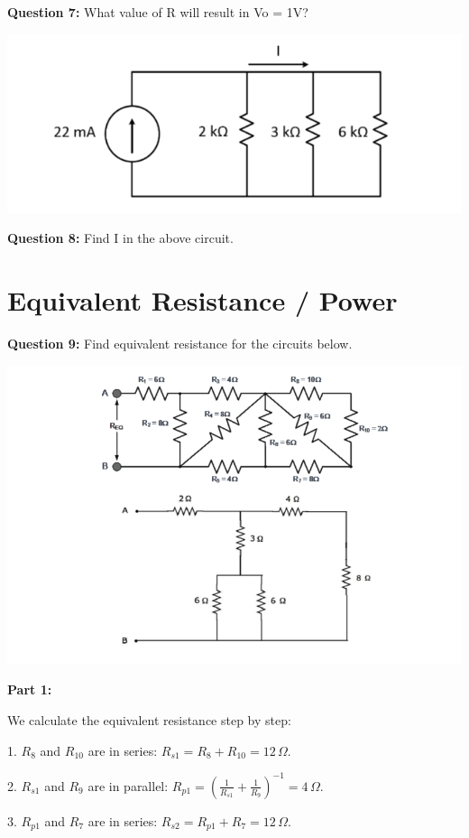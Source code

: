 \documentclass{article}
\begin{document}
\textbf{Question 7:} What value of R will result in Vo = 1V?

\begin{center}
\includegraphics[width=0.75\linewidth]{figures/6.png}
\end{center}

\textbf{Question 8:} Find I in the above circuit.

\section*{Equivalent Resistance / Power}
\textbf{Question 9:} Find equivalent resistance for the circuits below.

\begin{center}

        \includegraphics[width=0.75\linewidth]{figures/image.png}
\end{center}

\textbf{Part 1:}

We calculate the equivalent resistance step by step:

1. \( R_8 \) and \( R_{10} \) are in series:  
   \( R_{s1} = R_8 + R_{10} = 12 \, \Omega \).

2. \( R_{s1} \) and \( R_9 \) are in parallel:  
   \( R_{p1} = \left( \frac{1}{R_{s1}} + \frac{1}{R_9} \right)^{-1} = 4 \, \Omega \).

3. \( R_{p1} \) and \( R_7 \) are in series:  
   \( R_{s2} = R_{p1} + R_7 = 12 \, \Omega \).
\end{document}
